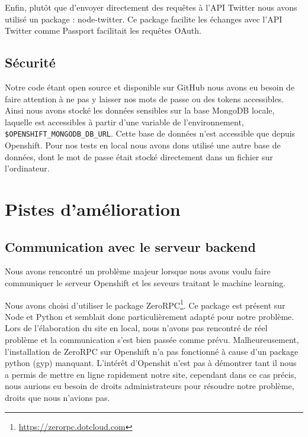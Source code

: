 \documentclass[a4paper]{article}
\begin{document}
Enfin, plutôt que d'envoyer directement des requêtes à l'API Twitter nous avons utilisé un package : node-twitter. Ce package facilite les échanges avec l'API Twitter comme Passport facilitait les requêtes OAuth.

\subsection{Sécurité}
Notre code étant open source et disponible sur GitHub nous avons eu besoin de faire attention à ne pas y laisser nos mots de passe ou des tokens accessibles. Ainsi nous avons stocké les données sensibles sur la base MongoDB locale, laquelle est accessibles à partir d'une variable de l'environnement, \texttt{\$OPENSHIFT\_MONGODB\_DB\_URL}. Cette base de données n'est accessible que depuis Openshift. Pour nos tests en local nous avons dons utilisé une autre base de données, dont le mot de passe était stocké directement dans un fichier sur l'ordinateur.


\section{Pistes d'amélioration}

\subsection{Communication avec le serveur backend}
Nous avons rencontré un problème majeur lorsque nous avons voulu faire communiquer le serveur Openshift et les seveurs traitant le machine learning. 

Nous avons choisi d'utiliser le package ZeroRPC\footnote{\url{https://zerorpc.dotcloud.com}}. Ce package est présent sur Node et Python et semblait donc particulièrement adapté pour notre problème. Lors de l'élaboration du site en local, nous n'avons pas rencontré de réel problème et la communication s'est bien passée comme prévu. Malheureusement, l'installation de ZeroRPC sur Openshift n'a pas fonctionné à cause d'un package python (gyp) manquant. L'intérêt d'Openshit n'est pas à démontrer tant il nous a permis de mettre en ligne rapidement notre site, cependant dans ce cas précis, nous aurions eu besoin de droits administrateurs pour résoudre notre problème, droits que nous n'avions pas. 
\end{document}

